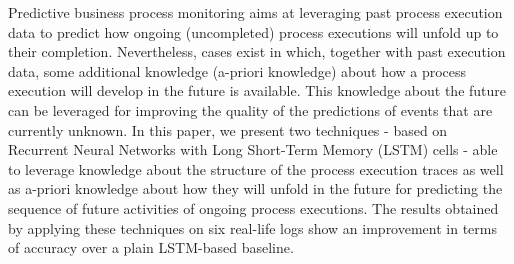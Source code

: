 Predictive business process monitoring aims at leveraging past process execution data to predict how ongoing (uncompleted) process executions will unfold up to
their completion.
Nevertheless, cases exist in which, together with past
execution data, some additional knowledge (a-priori
knowledge) about how a process execution will develop in the future is available. This knowledge about the future can be leveraged for
improving the quality of the predictions of events that are currently unknown. In this paper, we present two
techniques - based on Recurrent Neural Networks with Long Short-Term Memory (LSTM) cells - able to
leverage knowledge about the structure of the process execution traces as well as a-priori
knowledge about how they will unfold in the future for predicting the sequence of future activities of ongoing process executions. The results obtained by applying these techniques on six real-life logs show an improvement in terms of accuracy over a plain
LSTM-based baseline.

